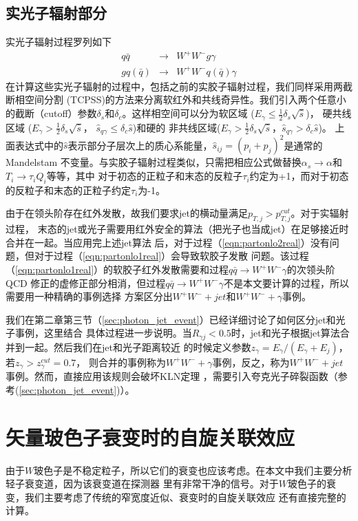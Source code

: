\subsection{实光子辐射部分}

实光子辐射过程罗列如下
\begin{eqnarray}
\label{eqn:partonlo1real}
q\bar{q} &\to& W^+ W^- g \gamma \\
\label{eqn:partonlo2real}
gq(\bar{q}) &\to& W^+W^- q(\bar{q}) \gamma 
\end{eqnarray}
在计算这些实光子辐射的过程中，包括之前的实胶子辐射过程，我们同样采用两截断相空间分割
(TCPSS)的方法来分离软红外和共线奇异性。我们引入两个任意小
的截断（cutoff）参数$\delta_s$和$\delta_c$。这样相空间可以分为软区域
($E_{\gamma} \le \frac{1}{2}\delta_s\sqrt{\hat{s}}$)， 硬共线区域
($E_{\gamma} > \frac{1}{2}\delta_s\sqrt{\hat{s}}$， $\hat{s}_{q\gamma} \leq \delta_c \hat{s}$)和硬的
非共线区域($E_{\gamma} > \frac{1}{2}\delta_s\sqrt{\hat{s}}$，$\hat{s}_{q\gamma} > \delta_c \hat{s}$)。
上面表达式中的$\hat{s}$表示部分子层次上的质心系能量，$\hat{s}_{ij} = (p_i+p_j)^2$是通常的Mandelstam
不变量。与实胶子辐射过程类似，只需把相应公式做替换$\alpha_s\to \alpha$和$T_i\to \tau_i Q_i$等等，其中
对于初态的正粒子和末态的反粒子$\tau_i$约定为+1，而对于初态的反粒子和末态的正粒子约定$\tau_i$为-1。

由于在领头阶存在红外发散，故我们要求jet的横动量满足$p_{T,j} > p^{cut}_{T,j}$。对于实辐射过程，
末态的jet或光子需要用红外安全的算法（把光子也当成jet）在足够接近时合并在一起。当应用完上述jet算法
后，对于过程（\ref{eqn:partonlo2real}）没有问题，但对于过程（\ref{eqn:partonlo1real}）会导致软胶子发散
问题。该过程（\ref{eqn:partonlo1real}）的软胶子红外发散需要和过程$q\bar{q}\to W^+W^-\gamma$的次领头阶QCD
修正的虚修正部分相消，但过程$q\bar{q}\to W^+W^-\gamma$不是本文要计算的过程，所以需要用一种精确的事例选择
方案区分出$W^+W^-+jet$和$W^+W^-+\gamma$事例。

我们在第二章第三节（\ref{sec:photon_jet_event}）已经详细讨论了如何区分jet和光子事例，这里结合
具体过程进一步说明。当$R_{\gamma j} < 0.5$时，jet和光子根据jet算法合并到一起。然后我们在jet和光子距离较近
的时候定义参数$z_{\gamma} = E_{\gamma}/(E_{\gamma} + E_j)$，若$z_{\gamma} > z^{cut}_{\gamma} = 0.7$，
则合并的事例称为$W^+W^-+\gamma$事例，反之，称为$W^+W^-+jet$事例。然而，直接应用该规则会破坏KLN定理
\cite{KLNtheorem-K,KLNtheorem-LN}，需要引入夸克光子碎裂函数（参考(\ref{sec:photon_jet_event})）。

\section{矢量玻色子衰变时的自旋关联效应}
由于$W$玻色子是不稳定粒子，所以它们的衰变也应该考虑。在本文中我们主要分析轻子衰变道，因为该衰变道在探测器
里有非常干净的信号。对于$W$玻色子的衰变，我们主要考虑了传统的窄宽度近似、衰变时的自旋关联效应
还有直接完整的计算。

